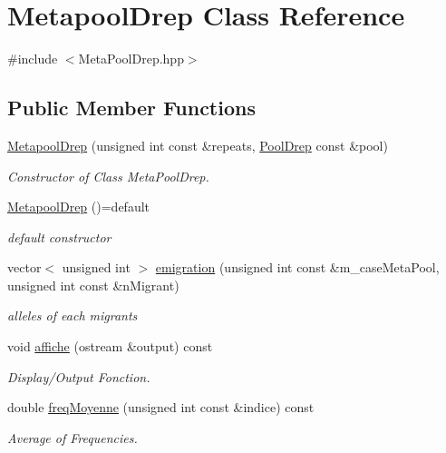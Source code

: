 \hypertarget{class_metapool_drep}{}\section{Metapool\+Drep Class Reference}
\label{class_metapool_drep}


{\ttfamily \#include $<$Meta\+Pool\+Drep.\+hpp$>$}

\subsection*{Public Member Functions}
\begin{DoxyCompactItemize}
\item 
\hyperlink{class_metapool_drep_a3b282bc91a103d690f176e1d563c5f3d}{Metapool\+Drep} (unsigned int const \&repeats, \hyperlink{class_pool_drep}{Pool\+Drep} const \&pool)
\begin{DoxyCompactList}\small\item\em Constructor of Class Meta\+Pool\+Drep. \end{DoxyCompactList}\item 
\hyperlink{class_metapool_drep_af22d366ba9cec3952af02381d74fb233}{Metapool\+Drep} ()=default
\begin{DoxyCompactList}\small\item\em default constructor \end{DoxyCompactList}\item 
vector$<$ unsigned int $>$ \hyperlink{class_metapool_drep_a2afa16210683360aa2e7fd2211e9453a}{emigration} (unsigned int const \&m\+\_\+case\+Meta\+Pool, unsigned int const \&n\+Migrant)
\begin{DoxyCompactList}\small\item\em alleles of each migrants \end{DoxyCompactList}\item 
void \hyperlink{class_metapool_drep_a8df2ee194c0e2b2310e3cf318266a22c}{affiche} (ostream \&output) const
\begin{DoxyCompactList}\small\item\em Display/\+Output Fonction. \end{DoxyCompactList}\item 
double \hyperlink{class_metapool_drep_a8961933ec06e330a23eece772203c202}{freq\+Moyenne} (unsigned int const \&indice) const
\begin{DoxyCompactList}\small\item\em Average of Frequencies. \end{DoxyCompactList}\item 

\end{DoxyCompactItemize}
